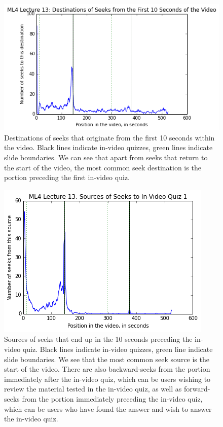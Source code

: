 \documentclass{sigchi}
\begin{document}
\begin{figure}
\includegraphics[width=1.0\columnwidth]{seekdest0}
\caption{Destinations of seeks that originate from the first 10 seconds within the video. Black lines indicate in-video quizzes, green lines indicate slide boundaries. We can see that apart from seeks that return to the start of the video, the most common seek destination is the portion preceding the first in-video quiz.}
\label{fig:seekdest0}
\end{figure}

\begin{figure}
\includegraphics[width=1.0\columnwidth]{seeksrc1}
\caption{Sources of seeks that end up in the 10 seconds preceding the in-video quiz. Black lines indicate in-video quizzes, green line indicate slide boundaries. We see that the most common seek source is the start of the video. There are also backward-seeks from the portion immediately after the in-video quiz, which can be users wishing to review the material tested in the in-video quiz, as well as forward-seeks from the portion immediately preceding the in-video quiz, which can be users who have found the answer and wish to answer the in-video quiz.}
\label{fig:seeksrc1}
\end{figure}
\end{document}
